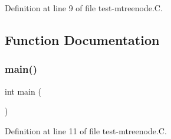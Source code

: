 Definition at line 9 of file test-\/mtreenode.\+C.



\subsection{Function Documentation}
\mbox{\label{test-mtreenode_8_c_ae66f6b31b5ad750f1fe042a706a4e3d4}} 
\subsubsection{\texorpdfstring{main()}{main()}}
{\footnotesize\ttfamily int main (\begin{DoxyParamCaption}{ }\end{DoxyParamCaption})}



Definition at line 11 of file test-\/mtreenode.\+C.

